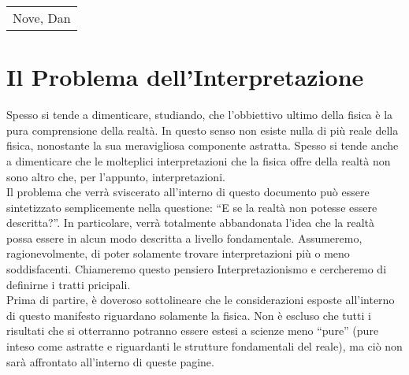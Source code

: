 \documentclass[]{article}
\begin{document}
	\begin{flushright}
		\begin{tabular}{@{}l@{}}
			Nove, Dan
		\end{tabular}
	\end{flushright}
	\section{Il Problema dell'Interpretazione}
	Spesso si tende a dimenticare, studiando, che l'obbiettivo ultimo della fisica è la pura comprensione della realtà. In questo senso non esiste nulla di più reale della fisica, nonostante la sua meravigliosa componente astratta. Spesso si tende anche a dimenticare che le molteplici interpretazioni che la fisica offre della realtà non sono altro che, per l'appunto, interpretazioni.  
	\\
	Il problema che verrà sviscerato all'interno di questo documento può essere sintetizzato semplicemente nella questione: \enquote{E se la realtà non potesse essere descritta?}. In particolare, verrà totalmente abbandonata l'idea che la realtà possa essere in alcun modo descritta a livello fondamentale. Assumeremo, ragionevolmente, di poter solamente trovare interpretazioni più o meno soddisfacenti. Chiameremo questo pensiero Interpretazionismo e cercheremo di definirne i tratti pricipali.\\
	Prima di partire, è doveroso sottolineare che le considerazioni esposte all'interno di questo manifesto riguardano solamente la fisica. Non è escluso che tutti i risultati che si otterranno potranno essere estesi a scienze meno \enquote{pure} (pure inteso come astratte e riguardanti le strutture fondamentali del reale), ma ciò non sarà affrontato all'interno di queste pagine. 
\end{document}
